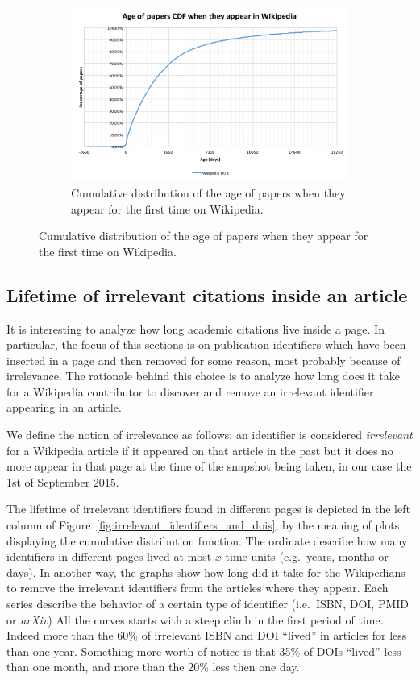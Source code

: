 \begin{figure}[h]
\begin{subfigure}{1\textwidth}
        \includegraphics[keepaspectratio=true, width=\linewidth]{assets/age_of_papers_at_first_appearance_cdf}
        \caption{Cumulative distribution of the age of papers when they appear for the first time on Wikipedia.}
\label{fig:age_of_papers_at_first_appearance_cdf}
    \end{subfigure}
\end{figure}

\subsection{Lifetime of irrelevant citations inside an article}
It is interesting to analyze how long academic citations live inside a page.
In particular, the focus of this sections is on publication identifiers which have been inserted in a page and then removed for some reason, most probably because of irrelevance.
The rationale behind this choice is to analyze how long does it take for a Wikipedia contributor to discover and remove an irrelevant identifier appearing in an article.

We define the notion of irrelevance as follows: an identifier is considered \emph{irrelevant} for a Wikipedia article if it appeared on that article in the past but it does no more appear in that page at the time of the snapshot being taken, in our case the 1st of September 2015.

The lifetime of irrelevant identifiers found in different pages is depicted in the left column of Figure~\ref{fig:irrelevant_identifiers_and_dois}, by the meaning of plots displaying the cumulative distribution function.
The ordinate describe how many identifiers in different pages lived at most $x$ time units (e.g.\ years, months or days).
In another way, the graphs show how long did it take for the Wikipedians to remove the irrelevant identifiers from the articles where they appear.
Each series describe the behavior of a certain type of identifier (i.e.\ \ac{ISBN}, \ac{DOI}, \ac{PMID} or \emph{arXiv})
All the curves starts with a steep climb in the first period of time.
Indeed more than the 60\% of irrelevant \ac{ISBN} and \ac{DOI} ``lived'' in articles for less than one year.
Something more worth of notice is that 35\% of \acp{DOI} ``lived'' less than one month, and more than the 20\% less then one day.

